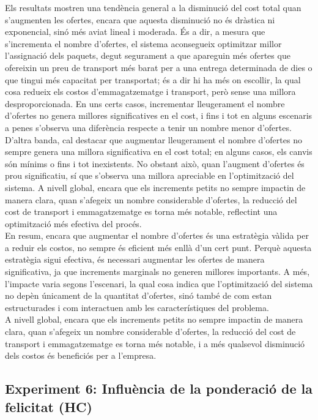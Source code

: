\documentclass[a4paper]{article}
\begin{document}
	
	Els resultats mostren una tendència general a la disminució del cost total quan s'augmenten les ofertes, encara que aquesta disminució no és dràstica ni exponencial, sinó més aviat lineal i moderada. És a dir, a mesura que s'incrementa el nombre d'ofertes, el sistema aconsegueix optimitzar millor l'assignació dels paquets, degut segurament a que apareguin més ofertes que ofereixin un preu de transport més barat per a una entrega determinada de dies o que tingui més capacitat per transportat; és a dir hi ha més on escollir, la qual cosa redueix els costos d'emmagatzematge i transport, però sense una millora desproporcionada. En uns certs casos, incrementar lleugerament el nombre d'ofertes no genera millores significatives en el cost, i fins i tot en alguns escenaris a penes s'observa una diferència respecte a tenir un nombre menor d'ofertes. \\
	
	D'altra banda, cal destacar que augmentar lleugerament el nombre d'ofertes no sempre genera una millora significativa en el cost total; en alguns casos, els canvis són mínims o fins i tot inexistents. No obstant això, quan l'augment d'ofertes és prou significatiu, sí que s'observa una millora apreciable en l'optimització del sistema. A nivell global, encara que els increments petits no sempre impactin de manera clara, quan s'afegeix un nombre considerable d'ofertes, la reducció del cost de transport i emmagatzematge es torna més notable, reflectint una optimització més efectiva del procés. \\
	
	En resum, encara que augmentar el nombre d'ofertes és una estratègia vàlida per a reduir els costos, no sempre és eficient més enllà d'un cert punt. Perquè aquesta estratègia sigui efectiva, és necessari augmentar les ofertes de manera significativa, ja que increments marginals no generen millores importants. A més, l'impacte varia segons l'escenari, la qual cosa indica que l'optimització del sistema no depèn únicament de la quantitat d'ofertes, sinó també de com estan estructurades i com interactuen amb les característiques del problema. \\
	
	A nivell global, encara que els increments petits no sempre impactin de manera clara, quan s'afegeix un nombre considerable d'ofertes, la reducció del cost de transport i emmagatzematge es torna més notable, i a més qualsevol disminució dels costos és beneficiós per a l'empresa.
	
	\subsection{Experiment 6: Influència de la ponderació de la felicitat (HC)}
	
\end{document}
